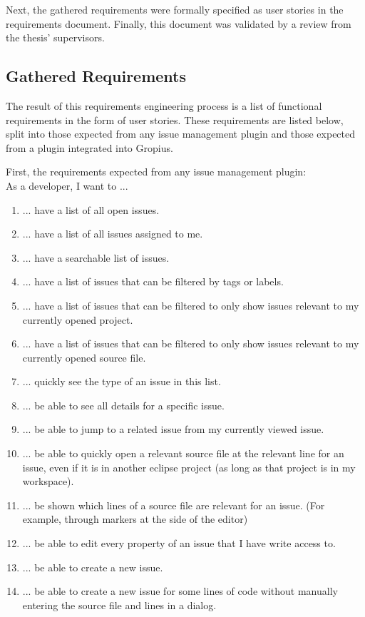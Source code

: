 Next, the gathered requirements were formally specified as user stories in the requirements document.
Finally, this document was validated by a review from the thesis' supervisors.


\subsection*{Gathered Requirements}
The result of this requirements engineering process is a list of functional requirements in the form of user stories.
These requirements are listed below, split into those expected from any issue management plugin and those expected from a plugin integrated into \gls{Gropius}.


First, the requirements expected from any issue management plugin:\\
As a developer, I want to ...
\begin{enumerate}
	\item ... have a list of all open issues. \label{itm:ch3:req:filter_open}
	\item ... have a list of all issues assigned to me. \label{itm:ch3:req:filter_me}
	\item ... have a searchable list of issues. \label{itm:ch3:req:filter_search}
	\item ... have a list of issues that can be filtered by tags or labels. \label{itm:ch3:req:filter_labels}
	\item ... have a list of issues that can be filtered to only show issues relevant to my currently opened project. \label{itm:ch3:req:filter_open project}
	\item ... have a list of issues that can be filtered to only show issues relevant to my currently opened source file. \label{itm:ch3:req:filter_open_file}
	\item ... quickly see the type of an issue in this list. \label{itm:ch3:req:list_issue_type}
	\item ... be able to see all details for a specific issue.
	\item ... be able to jump to a related issue from my currently viewed issue.
	\item ... be able to quickly open a relevant source file at the relevant line for an issue, even if it is in another eclipse project (as long as that project is in my workspace).
	\item ... be shown which lines of a source file are relevant for an issue. (For example, through markers at the side of the editor) \label{itm:ch3:req:source_file_marker}
	\item ... be able to edit every property of an issue that I have write access to.
	\item ... be able to create a new issue.
	\item ... be able to create a new issue for some lines of code without manually entering the source file and lines in a dialog.
	\setcounter{enumarteCounter}{\value{enumi}} %
\end{enumerate}

